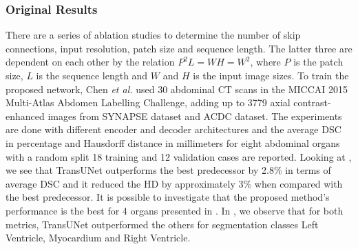 \documentclass{IEEEtran}
\begin{document}
\vfill\null\newpage

\begin{table}[h]
\caption{Automated Cardiac Diagnosis Challenge dataset results}\label{tab:acdc}
\end{table}

\subsubsection{Original Results \cite{chen2021transunet}}

There are a series of ablation studies to determine the number of skip connections, input resolution, patch size and sequence length. The latter three are dependent on each other by the relation $P^2L = WH = W^2$, where $P$ is the patch size, $L$ is the sequence length and $W$ and $H$ is the input image sizes. To train the proposed network, Chen \textit{et al.} used 30 abdominal CT scans in the MICCAI 2015 Multi-Atlas Abdomen Labelling Challenge, adding up to 3779 axial contrast-enhanced images from SYNAPSE dataset and ACDC dataset. The experiments are done with different encoder and decoder architectures and the average DSC in percentage and Hausdorff distance in millimeters for eight abdominal organs with a random split 18 training and 12 validation cases are reported. Looking at , we see that TransUNet outperforms the best predecessor by 2.8\% in terms of average DSC and it reduced the HD by approximately 3\% when compared with the best predecessor. It is possible to investigate that the proposed method's performance is the best for 4 organs presented in . In , we observe that for both metrics, TransUNet outperformed the others for segmentation classes Left Ventricle, Myocardium and Right Ventricle.
\vfill\null\newpage
\end{document}
